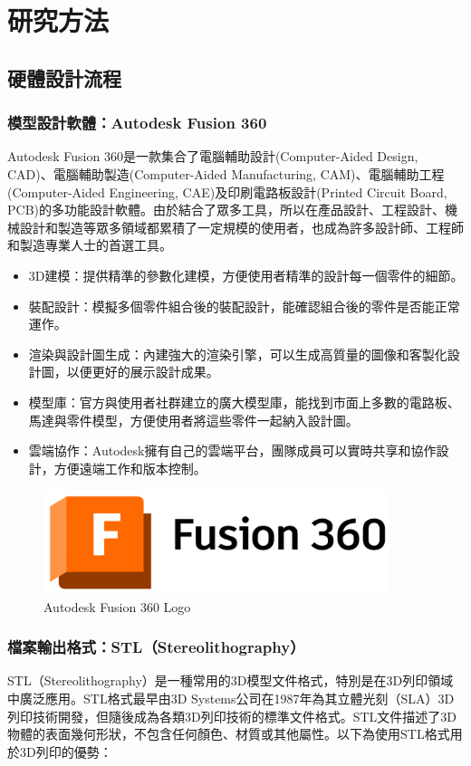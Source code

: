 \documentclass[class=NCU_thesis, crop=false]{standalone}
\begin{document}
\chapter{研究方法}
\section{硬體設計流程}
\subsection{模型設計軟體：Autodesk Fusion 360}
Autodesk Fusion 360是一款集合了電腦輔助設計(Computer-Aided Design, CAD)、電腦輔助製造(Computer-Aided Manufacturing, CAM)、電腦輔助工程(Computer-Aided Engineering, CAE)及印刷電路板設計(Printed Circuit Board, PCB)的多功能設計軟體。由於結合了眾多工具，所以在產品設計、工程設計、機械設計和製造等眾多領域都累積了一定規模的使用者，也成為許多設計師、工程師和製造專業人士的首選工具。

\begin{itemize}
	\item 3D建模：提供精準的參數化建模，方便使用者精準的設計每一個零件的細節。
	\item 裝配設計：模擬多個零件組合後的裝配設計，能確認組合後的零件是否能正常運作。
	\item 渲染與設計圖生成：內建強大的渲染引擎，可以生成高質量的圖像和客製化設計圖，以便更好的展示設計成果。
	\item 模型庫：官方與使用者社群建立的廣大模型庫，能找到市面上多數的電路板、馬達與零件模型，方便使用者將這些零件一起納入設計圖。
	\item 雲端協作：Autodesk擁有自己的雲端平台，團隊成員可以實時共享和協作設計，方便遠端工作和版本控制。
\end{itemize}

\begin{figure}[htbp]
    \centering
    \includegraphics[width=0.9\textwidth]{figures/autodesk-fusion-360-seeklogo.png}
\caption{Autodesk Fusion 360 Logo}
\end{figure}

\subsection{檔案輸出格式：STL（Stereolithography）}
STL（Stereolithography）是一種常用的3D模型文件格式，特別是在3D列印領域中廣泛應用。STL格式最早由3D Systems公司在1987年為其立體光刻（SLA）3D列印技術開發，但隨後成為各類3D列印技術的標準文件格式。STL文件描述了3D物體的表面幾何形狀，不包含任何顏色、材質或其他屬性。以下為使用STL格式用於3D列印的優勢：
\end{document}
